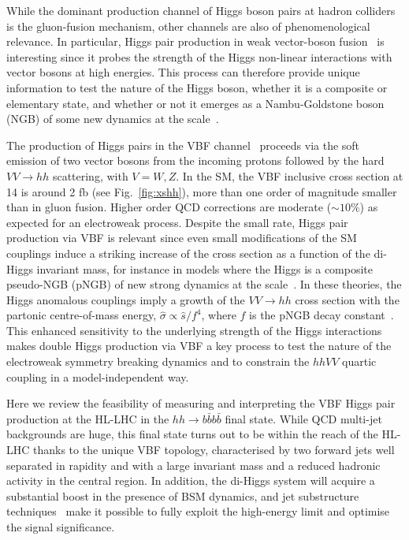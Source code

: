 
While the dominant production channel of Higgs boson pairs at hadron colliders is the gluon-fusion mechanism, other channels are also of phenomenological relevance. In particular, Higgs pair production in weak vector-boson fusion~\cite{Bishara:2016kjn} is interesting since it probes the
strength of the  Higgs non-linear interactions with vector bosons at high
energies. This process can therefore provide unique information
to test the nature of the Higgs boson,
whether it is a composite or elementary state, and whether or not it emerges as
a Nambu-Goldstone boson (NGB) of some new dynamics at the \UTeV
scale~\cite{Giudice:2007fh,Contino:2010mh,Contino:2013gna}.

The production of Higgs pairs in the  VBF
channel~\cite{Giudice:2007fh,Contino:2010mh,Dolan:2013rja,Brooijmans:2014eja,Liu-Sheng:2014gxa,Dolan:2015zja} proceeds via the soft emission of two vector bosons from the incoming protons  followed by 
the hard $VV \to hh$ scattering, with $V=W,Z$.
%
In the SM, the VBF inclusive cross section
at 14 \UTeV is around 2 fb (see Fig.~\ref{fig:xshh}), more than one
order of magnitude smaller than in gluon fusion.
Higher order QCD corrections are moderate ($\sim 10\%$) as
expected for an electroweak process.
%
Despite the small rate, Higgs pair production via VBF is relevant since
even small modifications of the SM couplings induce a striking increase of the
cross section as a function of the di-Higgs invariant mass, for instance in models 
where the Higgs is a composite pseudo-NGB (pNGB) of new strong dynamics at the \UTeV scale~\cite{Kaplan:1983fs}.
%
In these theories, the Higgs anomalous couplings imply a growth of the $VV\to hh$ cross section with the
partonic centre-of-mass energy, $\hat{\sigma} \propto \hat s/f^4$, where $f$ is the pNGB decay constant~\cite{Giudice:2007fh}.
%
This enhanced sensitivity to the underlying strength of the Higgs interactions makes 
double Higgs production via VBF a key process to test the nature of the
electroweak symmetry breaking dynamics
and to constrain the $hhVV$ quartic coupling in a model-independent way.

Here we review the feasibility of measuring and interpreting
the VBF Higgs pair production at the HL-LHC in
the $hh\to b\bar{b}b\bar{b}$ final state.
%
While QCD multi-jet backgrounds are huge, this final state turns out
to be within the reach of the HL-LHC thanks to the unique VBF topology,
characterised by two forward jets well separated in rapidity and with a large
invariant mass and a reduced hadronic activity in the central region. 
In addition, the di-Higgs system will acquire a substantial boost
in the presence of BSM dynamics, and jet
substructure techniques~\cite{Salam:2009jx,Gouzevitch:2013qca,Behr:2015oqq} 
make it possible to fully exploit the
high-energy limit and optimise the signal significance.

